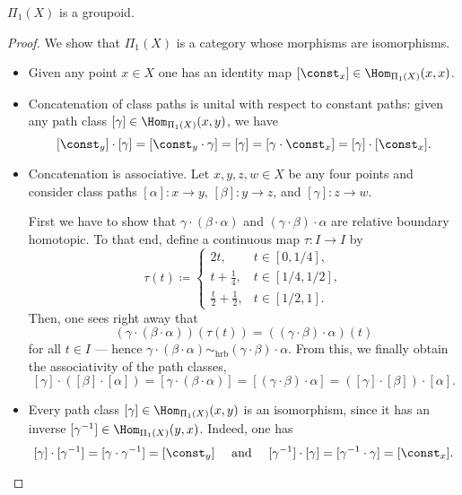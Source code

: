 \begin{corollary}
\label{cor:Pi1-is-groupoid}
\(\Pi_1(X)\) is a groupoid.
\end{corollary}

\begin{proof}
We show that \(\Pi_1(X)\) is a category whose morphisms are isomorphisms.
\begin{itemize}\setlength\itemsep{0em}
\item Given any point \(x \in X\) one has an identity map
  \([\const_x] \in \Hom_{\Pi_1(X)}(x, x)\).

\item Concatenation of class paths is unital with respect to constant paths:
  given any path class \([\gamma] \in \Hom_{\Pi_1(X)}(x, y)\), we have
  \[
  [\const_y] \cdot [\gamma]
  = [\const_y \cdot \gamma]
  = [\gamma]
  = [\gamma \cdot \const_x]
  = [\gamma] \cdot [\const_x].
  \]

\item Concatenation is associative. Let \(x, y, z, w \in X\) be any four points
  and consider class paths \([\alpha]: x \to y\), \([\beta]: y \to z\), and
  \([\gamma]: z \to w\).

  First we have to show that \(\gamma \cdot (\beta \cdot \alpha)\) and
  \((\gamma \cdot \beta) \cdot \alpha\) are relative boundary homotopic. To that
  end, define a continuous map \(\tau: I \to I\) by
  \[
  \tau(t) \coloneq
  \begin{cases}
    2 t, &t \in [0, 1/4], \\
    t + \frac{1}{4}, &t \in [1/4, 1/2], \\
    \frac{t}{2} + \frac{1}{2}, &t \in [1/2, 1].
  \end{cases}
  \]
  Then, one sees right away that
  \[
  (\gamma \cdot (\beta \cdot \alpha))(\tau(t))
  = ((\gamma \cdot \beta) \cdot \alpha)(t)
  \]
  for all \(t \in I\) --- hence \(\gamma \cdot (\beta \cdot \alpha)
  \sim_{\text{hrb}} (\gamma \cdot \beta) \cdot \alpha\). From this, we finally
  obtain the associativity of the path classes,
  \[
  [\gamma] \cdot ([\beta] \cdot [\alpha])
  = [\gamma \cdot (\beta \cdot \alpha)]
  = [(\gamma \cdot \beta) \cdot \alpha]
  = ([\gamma] \cdot [\beta]) \cdot [\alpha].
  \]

\item Every path class \([\gamma] \in \Hom_{\Pi_1(X)}(x, y)\) is an isomorphism,
  since it has an inverse \([\gamma^{-1}] \in \Hom_{\Pi_1(X)}(y, x)\). Indeed,
  one has
  \[
  [\gamma] \cdot [\gamma^{-1}] = [\gamma \cdot \gamma^{-1}] = [\const_y]
  \quad\text{ and }\quad
  [\gamma^{-1}] \cdot [\gamma] = [\gamma^{-1} \cdot \gamma] = [\const_x].
  \]
\end{itemize}
\end{proof}

